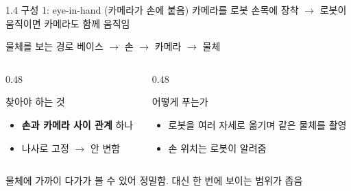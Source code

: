 \documentclass[aspectratio=169,11pt]{beamer}
\begin{document}
\begin{frame}{1.4 구성 1: eye-in-hand (카메라가 손에 붙음)}
  카메라를 로봇 손목에 장착 $\rightarrow$ 로봇이 움직이면 카메라도 함께 움직임
  \vfill
  \begin{block}{물체를 보는 경로}
    \centering
    베이스 $\rightarrow$ 손 $\rightarrow$ 카메라 $\rightarrow$ 물체
  \end{block}
  \vfill
  \begin{columns}[T]
    \begin{column}{0.48\textwidth}
      \begin{block}{찾아야 하는 것}
        \begin{minipage}[t][20mm][t]{\linewidth}
          \begin{itemize}
            \item \textbf{손과 카메라 사이 관계} 하나
            \item 나사로 고정 $\rightarrow$ 안 변함
          \end{itemize}
        \end{minipage}
      \end{block}
    \end{column}
    \begin{column}{0.48\textwidth}
      \begin{block}{어떻게 푸는가}
        \begin{minipage}[t][20mm][t]{\linewidth}
          \begin{itemize}
            \item 로봇을 여러 자세로 옮기며 같은 물체를 촬영
            \item 손 위치는 로봇이 알려줌
          \end{itemize}
        \end{minipage}
      \end{block}
    \end{column}
  \end{columns}
  \vfill
  \centering
  물체에 가까이 다가가 볼 수 있어 정밀함. 대신 한 번에 보이는 범위가 좁음
\end{frame}
\end{document}
